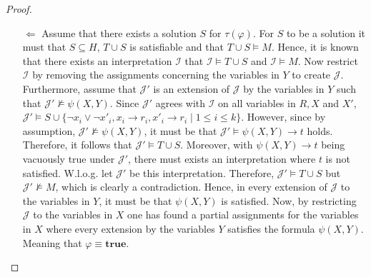 \documentclass [11pt]{article}
\newcommand{\ra}{\rightarrow}
\renewcommand{\phi}{\varphi}
\newcommand{\True}{\mathbf{true}}
\newcommand{\False}{\mathbf{false}}
\newcommand{\nmodels}{\not\models}
\begin{document}
\begin{proof}
\begin{itemize}
\item[$\Leftarrow$] Assume that there exists a solution $S$ for $\tau(\varphi)$. For $S$ to be a solution it must that $S \subseteq H$,  $T \cup S$ is satisfiable and that $T \cup S \models M$. Hence, it is known that there exists an interpretation $\mathcal{I}$ that $\mathcal{I} \models T \cup S$ and $\mathcal{I} \models M$. Now restrict $\mathcal{I}$ by removing the 
assignments concerning the variables in $Y$ to create $\mathcal{J}$. Furthermore, assume that $\mathcal{J}'$ is an extension of $\mathcal{J}$ by the variables in $Y$ such that $\mathcal{J}' \nmodels \psi(X,Y)$. Since $\mathcal{J}'$ agrees with $\mathcal{I}$ on all variables in $R, X$ and $X'$, $\mathcal{J}' \models S \cup \{\neg x_i \vee \neg x'_i, x_i \ra r_i, x'_i \ra r_i \mid 1 \leq i \leq k\} $. However, since by assumption, $\mathcal{J}' \nmodels \psi(X,Y)$, it must be that $\mathcal{J}' \models \psi(X,Y) \to t$ holds. Therefore, it follows that $\mathcal{J}' \models T \cup S$. Moreover, with $\psi(X,Y) \to t$ being vacuously true under $\mathcal{J}'$, there must exists an interpretation where $t$ is not satisfied. W.l.o.g. let $\mathcal{J}'$ be this interpretation. Therefore, $\mathcal{J}' \models T \cup S$ but $\mathcal{J}' \nmodels M$, which is clearly a contradiction. Hence, in every extension of $\mathcal{J}$ to the variables in $Y$, it must be that $\psi(X,Y)$ is satisfied. Now, by restricting $\mathcal{J}$ to the variables in $X$ one has found a partial assignments for the variables in $X$ where every extension by the variables $Y$ satisfies the formula $\psi(X,Y)$. Meaning that $\phi \equiv \True $.
%
%
%
\end{itemize}

\end{proof}
\medskip
\end{document}
